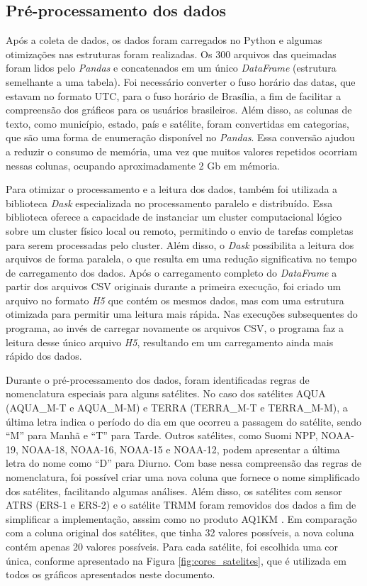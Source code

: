 \documentclass[cic,tc]{iiufrgs}
\begin{document}
\subsection*{Pré-processamento dos dados}

Após a coleta de dados, os dados foram carregados no Python e algumas otimizações nas estruturas foram realizadas. Os 300 arquivos das queimadas foram lidos pelo \textit{Pandas} e concatenados em um único \textit{DataFrame} (estrutura semelhante a uma tabela). Foi necessário converter o fuso horário das datas, que estavam no formato UTC, para o fuso horário de Brasília, a fim de facilitar a compreensão dos gráficos para os usuários brasileiros. Além disso, as colunas de texto, como município, estado, país e satélite, foram convertidas em categorias, que são uma forma de enumeração disponível no \textit{Pandas}. Essa conversão ajudou a reduzir o consumo de memória, uma vez que muitos valores repetidos ocorriam nessas colunas, ocupando aproximadamente 2 Gb em mémoria.

Para otimizar o processamento e a leitura dos dados, também foi utilizada a biblioteca \textit{Dask} especializada no processamento paralelo e distribuído. Essa biblioteca oferece a capacidade de instanciar um cluster computacional lógico sobre um cluster físico local ou remoto, permitindo o envio de tarefas completas para serem processadas pelo cluster. Além disso, o \textit{Dask} possibilita a leitura dos arquivos de forma paralela, o que resulta em uma redução significativa no tempo de carregamento dos dados. Após o carregamento completo do \textit{DataFrame} a partir dos arquivos CSV originais durante a primeira execução, foi criado um arquivo no formato \textit{H5} que contém os mesmos dados, mas com uma estrutura otimizada para permitir uma leitura mais rápida. Nas execuções subsequentes do programa, ao invés de carregar novamente os arquivos CSV, o programa faz a leitura desse único arquivo \textit{H5}, resultando em um carregamento ainda mais rápido dos dados.

Durante o pré-processamento dos dados, foram identificadas regras de nomenclatura especiais para alguns satélites. No caso dos satélites AQUA (AQUA\_M-T e AQUA\_M-M) e TERRA (TERRA\_M-T e TERRA\_M-M), a última letra indica o período do dia em que ocorreu a passagem do satélite, sendo ``M'' para Manhã e ``T'' para Tarde. Outros satélites, como Suomi NPP, NOAA-19, NOAA-18, NOAA-16, NOAA-15 e NOAA-12, podem apresentar a última letra do nome como ``D'' para Diurno. Com base nessa compreensão das regras de nomenclatura, foi possível criar uma nova coluna que fornece o nome simplificado dos satélites, facilitando algumas análises. Além disso, os satélites com sensor ATRS (ERS-1 e ERS-2) e o satélite TRMM foram removidos dos dados a fim de simplificar a implementação, asssim como no produto AQ1KM \citep{libonati2015algorithm}. Em comparação com a coluna original dos satélites, que tinha 32 valores possíveis, a nova coluna contém apenas 20 valores possíveis. Para cada satélite, foi escolhida uma cor única, conforme apresentado na Figura \ref{fig:cores_satelites}, que é utilizada em todos os gráficos apresentados neste documento. 
\end{document}

